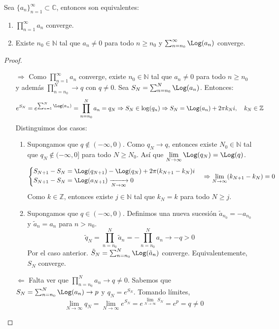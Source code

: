 \begin{theorem}
    Sea $\{a_n\}_{n=1}^\infty \subset \mathbb{C}$, entonces son equivalentes:
    \begin{enumerate}
        \item $\prod_{n=1}^\infty a_n$ converge.
        \item Existe $n_0 \in \mathbb{N}$ tal que $a_n \neq 0$ para todo $n \geq n_0$ y $\sum_{n=n_0}^\infty \Log(a_n)$ converge.
    \end{enumerate}
\end{theorem}

\begin{proof}
    \hfill
    \begin{itemize}
        \item[$\Rightarrow$] Como $\prod_{n=1}^\infty a_n$ converge, existe $n_0 \in \mathbb{N}$ tal que $a_n \neq 0$ para todo $n \geq n_0$ y además $\prod_{n=n_0}^N \to q$ con $q \neq 0$.
            Sea $S_N = \sum_{n=n_0}^N \Log(a_n)$.
            Entonces:
            $$e^{S_N} = e^{\sum_{n=1}^N \Log(a_n)} = \prod_{n=n_0}^N a_n = q_N \Rightarrow S_N \in \log(q_n) \Rightarrow S_N = \Log(a_n) + 2\pi k_Ni, \quad k_N \in \mathbb{Z}$$
            Distinguimos dos casos:
            \begin{enumerate}
                \item Supongamos que $q \notin (-\infty, 0)$.
                      Como $q_N \to q$, entonces existe $N_0 \in \mathbb{N}$ tal que $q_N \notin (-\infty, 0]$ para todo $N \geq N_0$.
                      Así que $\lim\limits_{N \to \infty} \Log(q_N) = \Log(q)$.
                      $$\begin{cases}
                              S_{N+1}-S_N = \Log(q_{N+1})-\Log(q_N) + 2\pi(k_{N+1}-k_N)i \\
                              S_{N+1}-S_N = \Log(a_{N+1}) \xrightarrow[N \to \infty]{} 0
                          \end{cases} \Rightarrow \lim_{N \to \infty} (k_{N+1}-k_N) = 0$$
                      Como $k \in \mathbb{Z}$, entonces existe $j \in \mathbb{N}$ tal que $k_N = k$ para todo $N \geq j$.

                \item Supongamos que $q \in (-\infty, 0)$.
                      Definimos una nueva sucesión $\tilde{a}_{n_0} = -a_{n_0}$ y $\tilde{a}_n = a_n$ para $n > n_0$.
                      $$\tilde{q}_N = \prod_{n=n_0}^N \tilde{a}_n = -\prod_{n=n_0}^N a_n \to -q > 0$$
                      Por el caso anterior. $\tilde{S}_N = \sum_{n=n_0}^N \Log(\tilde{a}_n)$ converge.
                      Equivalentemente, $S_N$ converge.
            \end{enumerate}

        \item[$\Leftarrow$] Falta ver que $\prod_{n=n_0}^N a_n \to q \neq 0$.
            Sabemos que $S_N = \sum_{n=n_0}^N \Log(a_n) \to p$ y $q_N = e^{S_N}$.
            Tomando límites,
            $$\lim_{N \to \infty} q_N = \lim_{N \to \infty} e^{S_N} = e^{\lim_{N \to \infty} S_N} = e^p = q \neq 0$$
    \end{itemize}
\end{proof}

